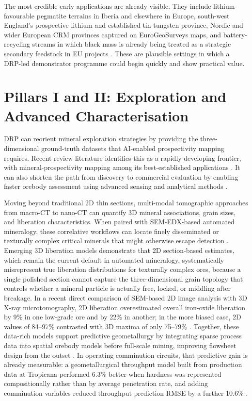 \documentclass[12pt,a4paper]{article}
\begin{document}
The most credible early applications are already visible. They include lithium-favourable pegmatite terrains in Iberia and elsewhere in Europe, south-west England's prospective lithium and established tin-tungsten province, Nordic and wider European CRM provinces captured on EuroGeoSurveys maps, and battery-recycling streams in which black mass is already being treated as a strategic secondary feedstock in EU projects \cite{egs_lithium_map_2020, bgs_uk_crm_2022, egs_crm_map_2016, batraw_2022}. These are plausible settings in which a DRP-led demonstrator programme could begin quickly and show practical value.

\section{Pillars I and II: Exploration and Advanced Characterisation}
DRP can reorient mineral exploration strategies by providing the three-dimensional ground-truth datasets that AI-enabled prospectivity mapping requires. Recent review literature identifies this as a rapidly developing frontier, with mineral-prospectivity mapping among its best-established applications \cite{yang_ai_exploration_2024, ai_mineral_prospectivity_2011}. It can also shorten the path from discovery to commercial evaluation by enabling faster orebody assessment using advanced sensing and analytical methods \cite{doe_arpae}.

Moving beyond traditional 2D thin sections, multi-modal tomographic approaches from macro-CT to nano-CT can quantify 3D mineral associations, grain sizes, and liberation characteristics. When paired with SEM-EDX-based automated mineralogy, these correlative workflows can locate finely disseminated or texturally complex critical minerals that might otherwise escape detection \cite{buyse_correlative_2023}. Emerging 3D liberation models demonstrate that 2D section-based estimates, which remain the current default in automated mineralogy, systematically misrepresent true liberation distributions for texturally complex ores, because a single polished section cannot capture the three-dimensional grain topology that controls whether a mineral particle is actually free, locked, or middling after breakage. In a recent direct comparison of SEM-based 2D image analysis with 3D X-ray microtomography, 2D liberation overestimated overall iron-oxide liberation by 9\% in one low-grade ore and by 22\% in another; in the more biased case, 2D values of 84--97\% contrasted with 3D maxima of only 75--79\% \cite{guntoro_liberation_2021, uliana_liberation_2025}. Together, these data-rich models support predictive geometallurgy by integrating sparse process data into spatial orebody models before full-scale mining, improving flowsheet design from the outset \cite{lishchuk_predictive_2019}. In operating comminution circuits, that predictive gain is already measurable: a geometallurgical throughput model built from production data at Tropicana performed 6.3\% better when hardness was represented compositionally rather than by average penetration rate, and adding comminution variables reduced throughput-prediction RMSE by a further 10.6\% \cite{both_geomet_2021}.
\end{document}
